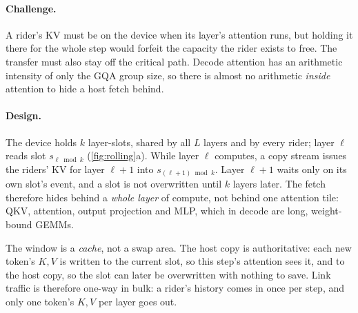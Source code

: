 

\paragraph{Challenge.} A rider's KV must be on the device when its layer's
attention runs, but holding it there for the whole step would forfeit the
capacity the rider exists to free. The transfer must also stay off the critical
path. Decode attention has an arithmetic intensity of only the GQA group size,
so there is almost no arithmetic \emph{inside} attention to hide a host fetch
behind.

\paragraph{Design.} The device holds $k$ layer-slots, shared by all $L$ layers
and by every rider; layer $\ell$ reads slot $s_{\ell \bmod k}$
(\cref{fig:rolling}a). While layer $\ell$ computes, a copy stream issues the
riders' KV for layer $\ell{+}1$ into $s_{(\ell+1)\bmod k}$. Layer $\ell{+}1$
waits only on its own slot's event, and a slot is not overwritten until $k$
layers later. The fetch therefore hides behind a \emph{whole layer} of compute,
not behind one attention tile: QKV, attention, output projection and MLP, which
in decode are long, weight-bound GEMMs.

The window is a \emph{cache}, not a swap area. The host copy is authoritative:
each new token's $K,V$ is written to the current slot, so this step's attention
sees it, and to the host copy, so the slot can later be overwritten with nothing
to save. Link traffic is therefore one-way in bulk: a rider's history comes in
once per step, and only one token's $K,V$ per layer goes out.

